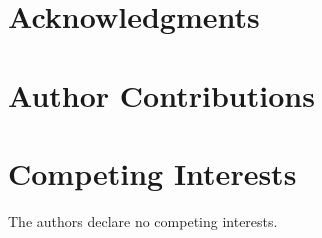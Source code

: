 \documentclass[]{fairmeta}
\let\oldaddcontentsline\addcontentsline
\newcommand{\starttocentries}{\let\addcontentsline\oldaddcontentsline}
\begin{document}
\section{Acknowledgments}
\label{sec:acknowledgements}

\section{Author Contributions}
\label{sec:author_contributions}

\section{Competing Interests}
\label{sec:competing_interests}

The authors declare no competing interests.




\clearpage
\newpage
\beginappendix

\tableofcontents

\starttocentries

\clearpage
\newpage




\clearpage
\newpage


\end{document}
